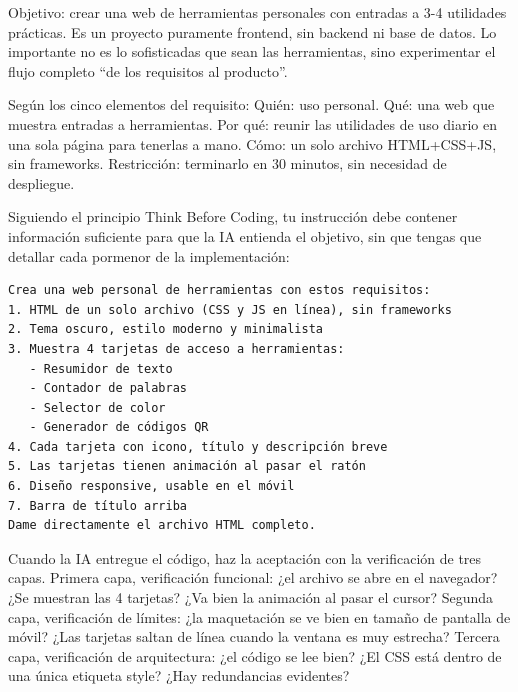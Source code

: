 



Objetivo: crear una web de herramientas personales con entradas a 3-4 utilidades prácticas. Es un proyecto puramente frontend, sin backend ni base de datos. Lo importante no es lo sofisticadas que sean las herramientas, sino experimentar el flujo completo “de los requisitos al producto”.

Según los cinco elementos del requisito: Quién: uso personal. Qué: una web que muestra entradas a herramientas. Por qué: reunir las utilidades de uso diario en una sola página para tenerlas a mano. Cómo: un solo archivo HTML+CSS+JS, sin frameworks. Restricción: terminarlo en 30 minutos, sin necesidad de despliegue.


Siguiendo el principio Think Before Coding, tu instrucción debe contener información suficiente para que la IA entienda el objetivo, sin que tengas que detallar cada pormenor de la implementación:

\begin{lstlisting}
Crea una web personal de herramientas con estos requisitos:
1. HTML de un solo archivo (CSS y JS en línea), sin frameworks
2. Tema oscuro, estilo moderno y minimalista
3. Muestra 4 tarjetas de acceso a herramientas:
   - Resumidor de texto
   - Contador de palabras
   - Selector de color
   - Generador de códigos QR
4. Cada tarjeta con icono, título y descripción breve
5. Las tarjetas tienen animación al pasar el ratón
6. Diseño responsive, usable en el móvil
7. Barra de título arriba
Dame directamente el archivo HTML completo.
\end{lstlisting}


Cuando la IA entregue el código, haz la aceptación con la verificación de tres capas. Primera capa, verificación funcional: ¿el archivo se abre en el navegador? ¿Se muestran las 4 tarjetas? ¿Va bien la animación al pasar el cursor? Segunda capa, verificación de límites: ¿la maquetación se ve bien en tamaño de pantalla de móvil? ¿Las tarjetas saltan de línea cuando la ventana es muy estrecha? Tercera capa, verificación de arquitectura: ¿el código se lee bien? ¿El CSS está dentro de una única etiqueta style? ¿Hay redundancias evidentes?

